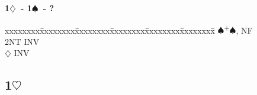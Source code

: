 \documentclass[10pt]{article}
\renewcommand{\c}{$\clubsuit$}
\renewcommand{\d}{$\diamondsuit$}
\newcommand{\h}{$\heartsuit$}
\newcommand{\s}{$\spadesuit$}
\newcommand{\p}{\textsuperscript{+}}
\newcommand{\m}{\textsuperscript{\textminus}}
\newenvironment{bidtable}[1][]
{\textbf{#1}
  \begin{adjustwidth}{1em}{}
    \addvspace{2pt}
    \begin{tabbing}
      xxxxxxxx\=xxxxxxxx\=xxxxxxxx\=xxxxxxxx\=xxxxxxxx\=xxxxxxxx\=\kill}
{\end{tabbing}\end{adjustwidth}\bigskip}%
\newcommand{\pdfh}{\texorpdfstring{\h{}}{H}}
\begin{document}
\begin{multicols*}{2}
\begin{bidtable}[1\d\ - 1\s\ - ?]
     \s  {}\p\s, NF                              \\
     \> 2NT  \> INV                                    \\
     \d  \> INV                                    %
\end{bidtable}

\newpage
\subsection{1\pdfh}


\end{multicols*}
\end{document}
